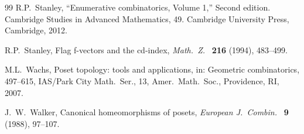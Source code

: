 \documentclass[reqno,12pt]{amsart}
\numberwithin{equation}{section}
\newcommand{\0}{\widehat{0}}
\newcommand{\1}{\widehat{1}}
\newcommand{\2}{\widehat{2}}
\begin{document}
\begin{thebibliography}{99}
R.P.\ Stanley, 
``Enumerative combinatorics, Volume 1,''
Second edition. Cambridge Studies in Advanced Mathematics, 49. Cambridge
University Press, Cambridge, 2012. 

R.P.\ Stanley, 
Flag f-vectors and the cd-index,
{\it Math.\ Z.\ } {\bf 216} (1994), 483--499.   


M.L.\ Wachs, 
Poset topology: tools and applications, in: Geometric combinatorics, 497--615,
IAS/Park City Math.\ Ser., 13, Amer.\ Math.\ Soc., Providence, RI, 2007.

J.\ W.\ Walker,
Canonical homeomorphisms of posets,
{\it European J.\ Combin.\ } {\bf 9} (1988), 97--107. 

\end{thebibliography}
\end{document}

